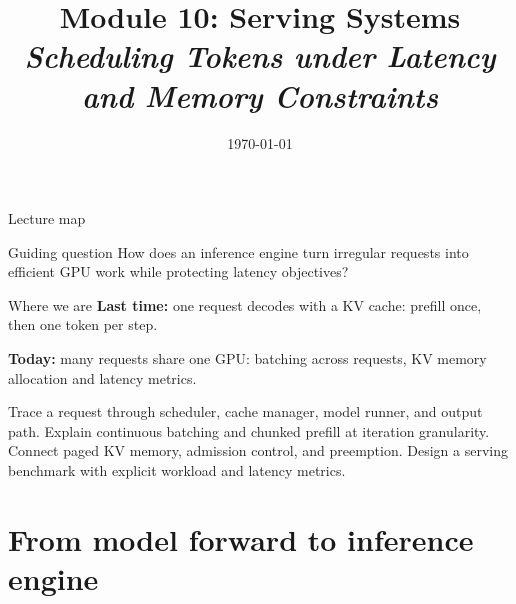 \documentclass[handout]{beamer}
\title[TASLLM -- Module 10]{Module 10: Serving Systems\\[4pt]
\normalsize\itshape Scheduling Tokens under Latency and Memory Constraints}
\date{\today}
\begin{document}
\makelecturetitle
\begin{frame}{Lecture map}
  \tableofcontents
  \vfill
  \begin{block}{Guiding question}
    How does an inference engine turn irregular requests into efficient GPU work while protecting latency objectives?
  \end{block}
\end{frame}

\begin{frame}{Where we are}
  \vspace{10pt}
  \textbf{\textcolor{accentdark}{Last time:}} one request decodes with a KV cache: prefill once, then one token per step.\par
  \vspace{10pt}
  \textbf{\textcolor{signaldark}{Today:}} many requests share one GPU: batching across requests, KV memory allocation and latency metrics.
\end{frame}
\learninggoals
{Trace a request through scheduler, cache manager, model runner, and output path.}
{Explain continuous batching and chunked prefill at iteration granularity.}
{Connect paged KV memory, admission control, and preemption.}
{Design a serving benchmark with explicit workload and latency metrics.}

\section{From model forward to inference engine}
\end{document}
